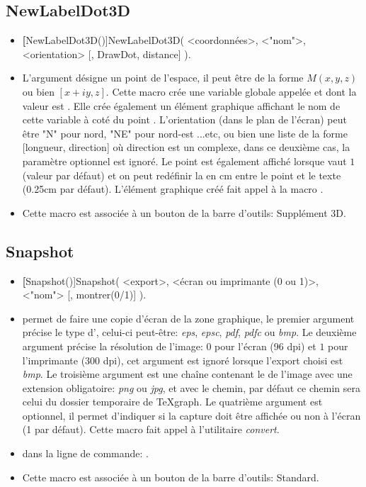 \subsection{NewLabelDot3D}

\begin{itemize}
 \item \util \textbf[NewLabelDot3D()]{NewLabelDot3D( <coordonnées>, <"nom">, <orientation> [, DrawDot, distance] )}.
 \item \desc L'argument  désigne un point de l'espace, il peut être de la forme $M(x,y,z)$ ou bien $[x+iy,z]$. Cette macro crée une variable globale appelée  et dont la valeur est . Elle crée également un élément graphique affichant le nom de cette variable à coté du point . L'orientation (dans le plan de l'écran) peut être "N" pour nord, "NE" pour nord-est ...etc, ou bien une liste de la forme [longueur, direction] où direction est un complexe, dans ce deuxième cas, la paramètre optionnel  est ignoré. Le point est également affiché lorsque  vaut $1$ (valeur par défaut) et on peut redéfinir la  en cm entre le point et le texte (0.25cm par défaut). L'élément graphique créé fait appel à la macro .
 \item Cette macro est associée à un bouton de la barre d'outils: Supplément 3D.
\end{itemize}


\subsection{Snapshot}

\begin{itemize}
 \item \util \textbf[Snapshot()]{Snapshot( <export>, <écran ou imprimante (0 ou 1)>, <"nom"> [, montrer(0/1)] )}.
 \item \desc permet de faire une copie d'écran de la zone graphique, le premier argument précise le type d', celui-ci peut-être: \textit{eps}, \textit{epsc}, \textit{pdf}, \textit{pdfc} ou \textit{bmp}. Le deuxième argument précise la résolution de l'image: $0$ pour l'écran (96 dpi) et $1$ pour l'imprimante (300 dpi), cet argument est ignoré lorsque l'export choisi est \textit{bmp}. Le troisième argument est une chaîne contenant le  de l'image avec une extension obligatoire: \textit{png} ou \textit{jpg}, et avec le chemin, par défaut ce chemin sera celui du dossier temporaire de TeXgraph. Le quatrième argument est optionnel, il permet d'indiquer si la capture doit être affichée ou non à l'écran (1 par défaut). Cette macro fait appel à l'utilitaire \textit{convert}. 
 \item \exem dans la ligne de commande: .
 \item Cette macro est associée à un bouton de la barre d'outils: Standard.
\end{itemize}


